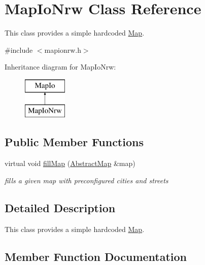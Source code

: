 \hypertarget{class_map_io_nrw}{}\section{Map\+Io\+Nrw Class Reference}
\label{class_map_io_nrw}


This class provides a simple hardcoded \hyperlink{class_map}{Map}.  




{\ttfamily \#include $<$mapionrw.\+h$>$}

Inheritance diagram for Map\+Io\+Nrw\+:\begin{figure}[H]
\begin{center}
\leavevmode
\includegraphics[height=2.000000cm]{class_map_io_nrw}
\end{center}
\end{figure}
\subsection*{Public Member Functions}
\begin{DoxyCompactItemize}
\item 
virtual void \hyperlink{class_map_io_nrw_ab81d348eadcf8f729c3abc6f1e9517e0}{fill\+Map} (\hyperlink{class_abstract_map}{Abstract\+Map} \&map)
\begin{DoxyCompactList}\small\item\em fills a given map with preconfigured cities and streets \end{DoxyCompactList}\end{DoxyCompactItemize}


\subsection{Detailed Description}
This class provides a simple hardcoded \hyperlink{class_map}{Map}. 

\subsection{Member Function Documentation}
\mbox{\label{class_map_io_nrw_ab81d348eadcf8f729c3abc6f1e9517e0}} 
